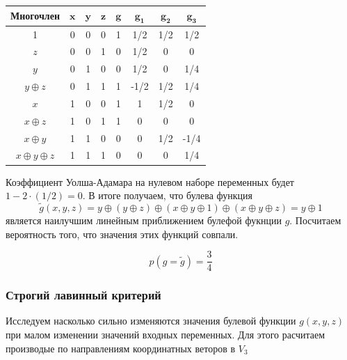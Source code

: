 \documentclass[a4paper,12pt]{article}
\theoremstyle{definition}
\begin{document}
	\begin{table}[h!]
		\begin{center}
			\begin{tabular}{|c|c|c|c||c||c|c|c|}
				\hline
				\textbf{Многочлен} & $ \pmb{x} $ & $ \pmb{y} $ & $ \pmb{z} $ & $ \pmb{g} $ & $ \pmb{g_1} $ & $ \pmb{g_2} $ & $ \pmb{g_3} $ \\ \hline
					1 & 0 & 0 & 0 & 1 &  1/2 &  1/2 &  1/2 \\ \hline
				  $z$ & 0 & 0 & 1 & 0 &  1/2 &    0 &    0 \\ \hline
			   	  $y$ & 0 & 1 & 0 & 0 &  1/2 &    0 &  1/4 \\ \hline
		 $y \oplus z$ & 0 & 1 & 1 & 1 & -1/2 &  1/2 &  1/4 \\ \hline
				  $x$ & 1 & 0 & 0 & 1 &    1 &  1/2 &    0 \\ \hline
		 $x \oplus z$ & 1 & 0 & 1 & 1 &    0 &    0 &    0 \\ \hline
		 $x \oplus y$ & 1 & 1 & 0 & 0 &    0 &  1/2 & -1/4 \\ \hline
$x \oplus y \oplus z$ & 1 & 1 & 1 & 0 &    0 &    0 &  1/4 \\ \hline
			\end{tabular}
		\end{center}
	\end{table}

	Коэффициент Уолша-Адамара на нулевом наборе переменных будет $1 - 2 \cdot (1/2) = 0$. В итоге получаем, что булева функция	
	\[ \tilde{g}(x,y,z) = y \oplus \left(y \oplus z\right) \oplus  \left(x \oplus y \oplus 1 \right) \oplus \left(x \oplus y \oplus z\right)  = y \oplus 1\]
	является наилучшим линейным приближением булефой фукнции $g$. Посчитаем вероятность того, что значения этих функций совпали.
	
	\[ p(g=\tilde{g}) = \frac{3}{4} \]
	
	\subsubsection{Строгий лавинный критерий}
	
	Исследуем насколько сильно изменяются значения булевой функции $g(x, y, z)$ при малом изменении значений входных переменных. Для этого расчитаем производые по направлениям координатных веторов в $V_3$
	
\end{document}
